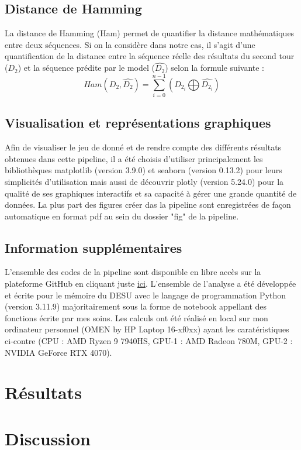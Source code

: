 \documentclass[11pt]{article}
\begin{document}
            \subsection*{Distance de Hamming}
                La distance de Hamming (Ham) permet de quantifier la distance mathématiques entre deux séquences. Si on la considère dans notre cas, il s'agit d'une quantification de la distance entre la séquence réelle des résultats du second tour ($D_2$) et la séquence prédite par le model ($\hat{D_2}$) selon la formule suivante :
                \begin{equation}
                    Ham(D_2, \hat{D_2}) = \sum_{i=0}^{n-1}(D_2_i \bigoplus \hat{D_2_i})
                \end{equation}

        \subsection*{Visualisation et représentations graphiques}
            Afin de visualiser le jeu de donné et de rendre compte des différents résultats obtenues dans cette pipeline, il a été choisis d'utiliser principalement les bibliothèques matplotlib (version 3.9.0) et seaborn (version 0.13.2) pour leurs simplicités d'utilisation mais aussi de découvrir plotly (version 5.24.0) pour la qualité de ses graphiques interactifs et sa capacité à gérer une grande quantité de données. La plus part des figures créer das la pipeline sont enregistrées de façon automatique en format pdf au sein du dossier "fig" de la pipeline.
            
        \subsection*{Information supplémentaires}
            L'ensemble des codes de la pipeline sont disponible en libre accès sur la plateforme GitHub en cliquant juste \href{https://github.com/alexandre-laine/Pipeline_Elections_Legislatives}{ici}. L'ensemble de l'analyse a été développée et écrite pour le mémoire du DESU avec le langage de programmation Python (version 3.11.9) majoritairement sous la forme de notebook appellant des fonctions écrite par mes soins. Les calculs ont été réalisé en local sur mon ordinateur personnel (OMEN by HP Laptop 16-xf0xx) ayant les caratéristiques ci-contre (CPU : AMD Ryzen 9 7940HS, GPU-1 : AMD Radeon 780M, GPU-2 : NVIDIA GeForce RTX 4070).

    \newpage
    \section{Résultats}

    \newpage
    \section{Discussion}

    \printbibliography
\end{document}
